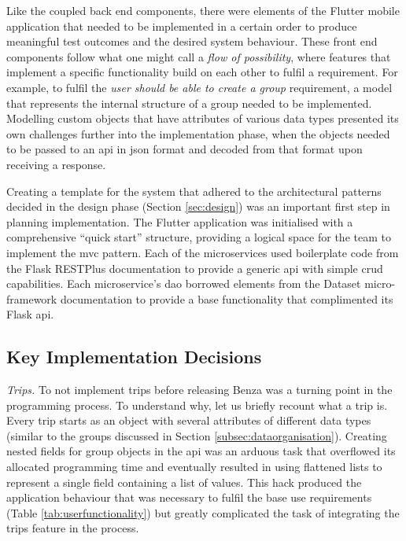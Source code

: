 \documentclass{article}
\begin{document}
    Like the coupled back end components, there were elements of the Flutter mobile application that needed to be implemented in a certain order to produce meaningful test outcomes and the desired system behaviour. These front end components follow what one might call a \emph{flow of possibility}, where features that implement a specific functionality build on each other to fulfil a requirement. For example, to fulfil the \emph{user should be able to create a group} requirement, a model that represents the internal structure of a group needed to be implemented. Modelling custom objects that have attributes of various data types presented its own challenges further into the implementation phase, when the objects needed to be passed to an \acrshort{api} in \acrshort{json} format and decoded from that format upon receiving a response. \par
    
    Creating a template for the system that adhered to the architectural patterns decided in the design phase (Section \ref{sec:design}) was an important first step in planning implementation. The Flutter application was initialised with a comprehensive ``quick start'' structure, providing a logical space for the team to implement the \acrshort{mvc} pattern. Each of the \glspl{microservice} used \gls{boilerplate} code from the Flask RESTPlus documentation \cite{flaskquickstartdocs} to provide a generic \acrshort{api} with simple \acrshort{crud} capabilities. Each \gls{microservice}'s \acrlong{dao} borrowed elements from the Dataset micro-framework documentation \cite{datasetquickstartdocs} to provide a base functionality that complimented its Flask \acrshort{api}.
    
    \subsection{Key Implementation Decisions}
    \label{subsec:keyimplementationdecisions}

    \emph{Trips.} To not implement trips before releasing Benza was a turning point in the programming process. To understand why, let us briefly recount what a trip is. Every trip starts as an object with several attributes of different data types (similar to the groups discussed in Section \ref{subsec:dataorganisation}). Creating nested fields for group objects in the \acrshort{api} was an arduous task that overflowed its allocated programming time and eventually resulted in using flattened lists to represent a single field containing a list of values. This hack produced the application behaviour that was necessary to fulfil the base use requirements (Table \ref{tab:userfunctionality}) but greatly complicated the task of integrating the trips feature in the process. \par
    
\end{document}
